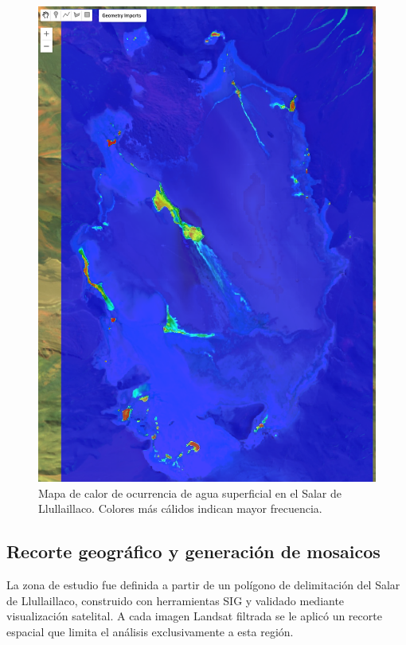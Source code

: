 \begin{figure}[htpb]
	\centering
	\includegraphics[scale=.3]{Figures/fig6.png}
	\caption{Mapa de calor de ocurrencia de agua superficial en el Salar de Llullaillaco. Colores más cálidos indican mayor frecuencia.}
	\label{fig:mapa_ocurrencias}
\end{figure}



\subsection{Recorte geográfico y generación de mosaicos}

La zona de estudio fue definida a partir de un polígono de delimitación del Salar de Llullaillaco, construido con herramientas SIG y validado mediante visualización satelital. A cada imagen Landsat filtrada se le aplicó un recorte espacial que limita el análisis exclusivamente a esta región.

